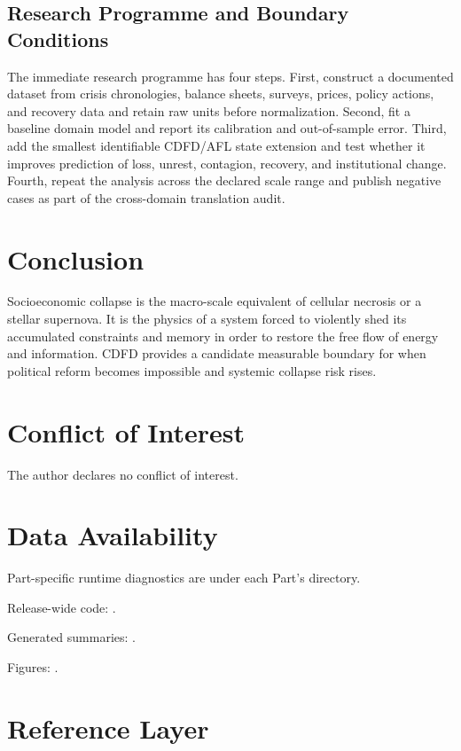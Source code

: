\documentclass[11pt,a4paper]{article}
\begin{document}
\subsection{Research Programme and Boundary Conditions}

The immediate research programme has four steps. First, construct a documented
dataset from crisis chronologies, balance sheets, surveys, prices, policy actions, and recovery data and retain raw units before normalization.
Second, fit a baseline domain model and report its calibration and out-of-sample
error. Third, add the smallest identifiable CDFD/AFL state extension and test
whether it improves prediction of loss, unrest, contagion, recovery, and institutional change. Fourth, repeat the
analysis across the declared scale range and publish negative cases as part of
the cross-domain translation audit.


\section{Conclusion}
Socioeconomic collapse is the macro-scale equivalent of cellular necrosis or a stellar supernova. It is the physics of a system forced to violently shed its accumulated constraints and memory in order to restore the free flow of energy and information. CDFD provides a candidate measurable boundary for when political reform becomes impossible and systemic collapse risk rises.
\section*{Conflict of Interest} The author declares no conflict of interest.
\section*{Data Availability}
Part-specific runtime diagnostics are under each Part's  directory.

Release-wide code: .

Generated summaries: .

Figures: .


\section{Reference Layer}


\end{document}

